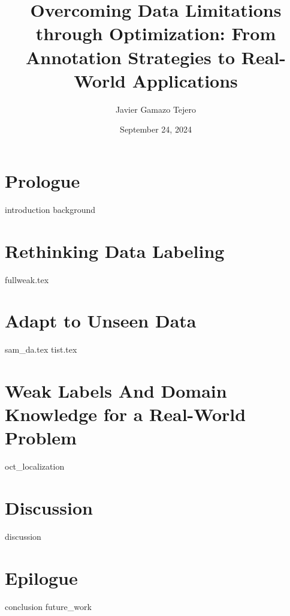 \documentclass[
    10pt,
	colorful,
	boxey,
 a4paper,
]{tufte-style-thesis}
\author{Javier Gamazo Tejero}
\title{Overcoming Data Limitations through Optimization: From Annotation Strategies to Real-World Applications}
\date{September 24, 2024}
\begin{document}
\ifdebug
    \layout
\fi


\frontmatter

\cleardoublepage
{}
\pagestyle{empty}
\begin{wide}

\end{wide}






\tableofcontents
\listoffigures
\listoftables

\clearpage
\pagestyle{fancy}


\mainmatter
{}

\part{Prologue}
{introduction}
{background}
\part{Rethinking Data Labeling}
{fullweak.tex}
\part{Adapt to Unseen Data}
{sam_da.tex}
{tist.tex}
\part{Weak Labels And Domain Knowledge for a Real-World Problem}
{oct_localization}
\part{Discussion}
{discussion}
\part{Epilogue}
{conclusion}
{future_work}



\thispagestyle{empty}
\printbibliography
\cleardoublepage
\end{document}
